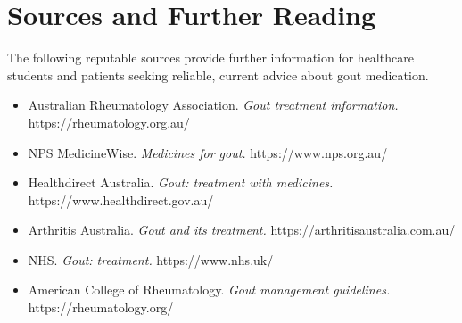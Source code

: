 \section*{Sources and Further Reading}
The following reputable sources provide further information for healthcare students and patients seeking reliable, current advice about gout medication.

\begin{itemize}
    \item Australian Rheumatology Association. \textit{Gout treatment information.} https://rheumatology.org.au/
    \item NPS MedicineWise. \textit{Medicines for gout.} https://www.nps.org.au/
    \item Healthdirect Australia. \textit{Gout: treatment with medicines.} https://www.healthdirect.gov.au/
    \item Arthritis Australia. \textit{Gout and its treatment.} https://arthritisaustralia.com.au/
    \item NHS. \textit{Gout: treatment.} https://www.nhs.uk/
    \item American College of Rheumatology. \textit{Gout management guidelines.} https://rheumatology.org/
\end{itemize}
